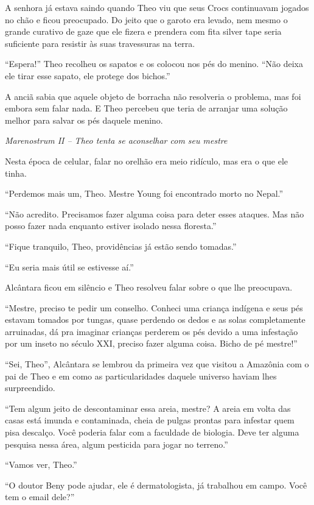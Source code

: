 A senhora já estava saindo quando Theo viu que seus Crocs continuavam
jogados no chão e ficou preocupado. Do jeito que o garoto era levado,
nem mesmo o grande curativo de gaze que ele fizera e prendera com fita
silver tape seria suficiente para resistir às suas travessuras na terra.

``Espera!'' Theo recolheu os sapatos e os colocou nos pés do menino.
``Não deixa ele tirar esse sapato, ele protege dos bichos.''

A anciã sabia que aquele objeto de borracha não resolveria o problema,
mas foi embora sem falar nada. E Theo percebeu que teria de arranjar uma
solução melhor para salvar os pés daquele menino.

\asterisc

\emph{Marenostrum II -- Theo tenta se aconselhar com seu mestre}

Nesta época de celular, falar no orelhão era meio ridículo, mas era o
que ele tinha.

``Perdemos mais um, Theo. Mestre Young foi encontrado morto no Nepal.''

``Não acredito. Precisamos fazer alguma coisa para deter esses ataques.
Mas não posso fazer nada enquanto estiver isolado nessa floresta.''

``Fique tranquilo, Theo, providências já estão sendo tomadas.''

``Eu seria mais útil se estivesse aí.''

Alcântara ficou em silêncio e Theo resolveu falar sobre o que lhe
preocupava.

``Mestre, preciso te pedir um conselho. Conheci uma criança indígena e
seus pés estavam tomados por tungas, quase perdendo os dedos e as solas
completamente arruinadas, dá pra imaginar crianças perderem os pés
devido a uma infestação por um inseto no século XXI, preciso fazer
alguma coisa. Bicho de pé mestre!''

``Sei, Theo'', Alcântara se lembrou da primeira vez que visitou a
Amazônia com o pai de Theo e em como as particularidades daquele
universo haviam lhes surpreendido.

``Tem algum jeito de descontaminar essa areia, mestre? A areia em volta
das casas está imunda e contaminada, cheia de pulgas prontas para
infestar quem pisa descalço. Você poderia falar com a faculdade de
biologia. Deve ter alguma pesquisa nessa área, algum pesticida para
jogar no terreno.''

``Vamos ver, Theo.''

``O doutor Beny pode ajudar, ele é dermatologista, já trabalhou em
campo. Você tem o email dele?''

